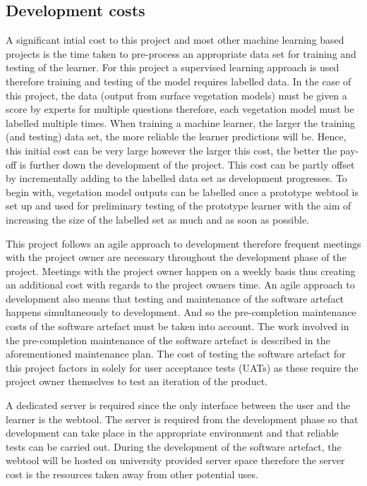 \documentclass{ecmm427_assignment}
\begin{document}
\subsection{Development costs}
A significant intial cost to this project and most other machine learning based projects is the time taken to pre-process an appropriate data set for training and testing of the learner. For this project a supervised learning approach is used therefore training and testing of the model requires labelled data. In the case of this project, the data (output from surface vegetation models) must be given a score by experts for multiple questions therefore, each vegetation model must be labelled multiple times. When training a machine learner, the larger the training (and testing) data set, the more reliable the learner predictions will be. Hence, this initial cost can be very large however the larger this cost, the better the pay-off is further down the development of the project. This cost can be partly offset by incrementally adding to the labelled data set as development progresses. To begin with, vegetation model outputs can be labelled once a prototype webtool is set up and used for preliminary testing of the prototype learner with the aim of increasing the size of the labelled set as much and as soon as possible.\par

This project follows an agile approach to development therefore frequent meetings with the project owner are necessary throughout the development phase of the project. Meetings with the project owner happen on a weekly basis thus creating an additional cost with regards to the project owners time. An agile approach to development also means that testing and maintenance of the software artefact happens simultaneously to development. And so the pre-completion maintenance costs of the software artefact must be taken into account. The work involved in the pre-completion maintenance of the software artefact is described in the aforementioned maintenance plan. The cost of testing the software artefact for this project factors in solely for user acceptance tests (UATs) as these require the project owner themselves to test an iteration of the product.\par

A dedicated server is required since the only interface between the user and the learner is the webtool. The server is required from the development phase so that development can take place in the appropriate environment and that reliable tests can be carried out. During the development of the software artefact, the webtool will be hosted on university provided server space therefore the server cost is the resources taken away from other potential uses.\par
\end{document}
